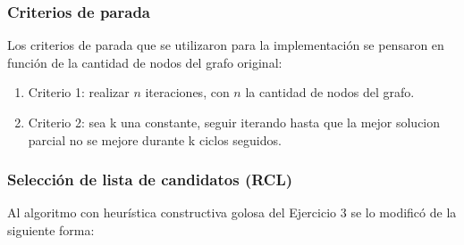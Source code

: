 \subsubsection{Criterios de parada}
Los criterios de parada que se utilizaron para la implementación se pensaron en función de la cantidad de nodos del grafo original:
\begin{enumerate}
    \item Criterio 1: realizar $n$ iteraciones, con $n$ la cantidad de nodos del grafo.
    \item Criterio 2: sea k una constante, seguir iterando hasta que la mejor solucion parcial no se mejore durante k ciclos seguidos.
\end{enumerate}

\subsubsection{Selección de lista de candidatos (RCL)}
Al algoritmo con heurística constructiva golosa del Ejercicio 3 se lo modificó de la siguiente forma:
